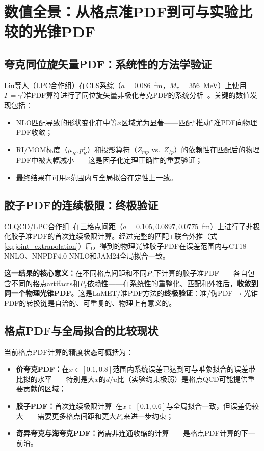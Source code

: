 \documentclass[12pt,a4paper]{ctexart}
\theoremstyle{definition}
\begin{document}
\section{数值全景：从格点准PDF到可与实验比较的光锥PDF}

\subsection{夸克同位旋矢量PDF：系统性的方法学验证}

Liu等人（LPC合作组）在CLS系综（$a=0.086$~fm，$M_\pi=356$~MeV）上使用$\Gamma=\gamma^t$准PDF算符进行了同位旋矢量非极化夸克PDF的系统分析~\cite{Liu2020isovector}。关键的数值发现包括：

\begin{itemize}[nosep]
    \item NLO匹配导致的形状变化在中等$x$区域尤为显著——匹配``推动''准PDF向物理PDF收敛；
    \item RI/MOM标度（$\mu_R, p_R^z$）和投影算符（$Z_{mp}$ vs.\ $Z_{/p}$）的依赖性在匹配后的物理PDF中被大幅减小——这是因子化定理正确性的重要验证；
    \item 最终结果在可用$x$范围内与全局拟合在定性上一致。
\end{itemize}

\subsection{胶子PDF的连续极限：终极验证}

CLQCD/LPC合作组~\cite{Chen2025gluon}在三格点间距（$a = 0.105, 0.0897, 0.0775$~fm）上进行了非极化胶子准PDF的首次连续极限计算。经过完整的匹配+联合外推（式\ref{eq:joint_extrapolation}）后，得到的物理光锥胶子PDF在误差范围内与CT18 NNLO、NNPDF4.0 NNLO和JAM24全局拟合一致。

\textbf{这一结果的核心意义：}在不同格点间距和不同$P_z$下计算的胶子准PDF——各自包含不同的格点artifacts和$P_z$依赖性——在系统性的重整化、匹配和外推后，\textbf{收敛到同一个物理光锥PDF}。这是LaMET/准PDF方法的\textbf{终极验证}：准/伪PDF$\to$光锥PDF的转换链是自洽的、可重复的、物理上有意义的。

\subsection{格点PDF与全局拟合的比较现状}

当前格点PDF计算的精度状态可概括为：
\begin{itemize}[nosep]
    \item \textbf{价夸克PDF：}在$x\in[0.1, 0.8]$范围内系统误差已达到可与唯象拟合的误差带比拟的水平——特别是大$x$的$d/u$比（实验约束极弱）是格点QCD可能提供重要贡献的区域；
    \item \textbf{胶子PDF：}首次连续极限计算~\cite{Chen2025gluon}在$x\in[0.1, 0.6]$与全局拟合一致，但误差仍较大——需要更多格点间距和更大$P_z$来进一步约束；
    \item \textbf{奇异夸克与海夸克PDF：}尚需非连通收缩的计算——是格点PDF计算的下一前沿。
\end{itemize}
\end{document}

